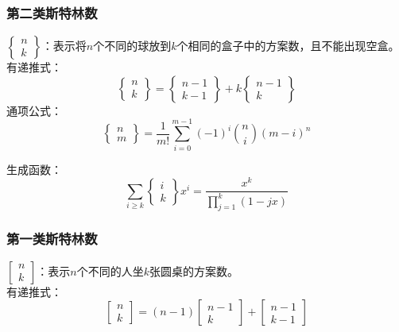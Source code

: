 \subsubsection{第二类斯特林数}

$\begin{Bmatrix} n\\ k \end{Bmatrix}$：表示将$n$个不同的球放到$k$个相同的盒子中的方案数，且不能出现空盒。\\

有递推式：\\
$$
\begin{Bmatrix} n\\ k \end{Bmatrix}=\begin{Bmatrix} n-1\\ k-1 \end{Bmatrix} +k\begin{Bmatrix} n-1\\ k \end{Bmatrix}
$$
通项公式：\\
$$
\begin{Bmatrix} n\\ m \end{Bmatrix}=\frac{1}{m!}\sum_{i=0}^{m-1}(-1)^i\binom{n}{i}(m-i)^n
$$

生成函数：\\

$$
\sum_{i\ge k} \begin{Bmatrix} i\\ k \end{Bmatrix} x^{i}=\frac{x^k}{\prod_{j=1}^{k}(1-jx)}
$$

\subsubsection{第一类斯特林数}

$\begin{bmatrix} n\\ k \end{bmatrix}$：表示$n$个不同的人坐$k$张圆桌的方案数。\\

有递推式：\\
$$
\begin{bmatrix} n\\ k \end{bmatrix}=(n-1)\begin{bmatrix} n-1\\ k \end{bmatrix}+\begin{bmatrix} n-1\\ k-1 \end{bmatrix}
$$

